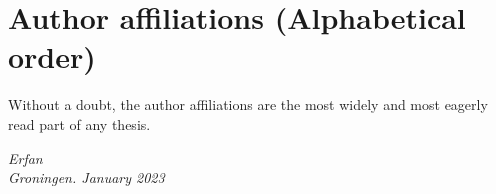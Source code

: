 \chapter*{Author affiliations  (Alphabetical order)}

Without a doubt, the author affiliations are the most widely and most
eagerly read part of any thesis.

\begin{flushright}
{\makeatletter\itshape
    Erfan\\
    Groningen. January 2023
\makeatother}
\end{flushright}


